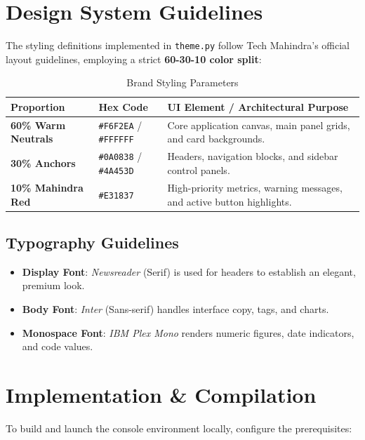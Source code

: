 \documentclass[11pt,a4paper]{article}
\begin{document}
\section{Design System Guidelines}
The styling definitions implemented in \texttt{theme.py} follow Tech Mahindra's official layout guidelines, employing a strict \textbf{60-30-10 color split}:

\begin{table}[h]
\centering
\caption{Brand Styling Parameters}
\label{tab:colors}
\begin{tabular}{@{}llp{8cm}@{}}
\toprule
\textbf{Proportion} & \textbf{Hex Code} & \textbf{UI Element / Architectural Purpose} \\ \bottomrule
\textbf{60\% Warm Neutrals}  & \texttt{\#F6F2EA} / \texttt{\#FFFFFF} & Core application canvas, main panel grids, and card backgrounds. \\
\textbf{30\% Anchors}         & \texttt{\#0A0838} / \texttt{\#4A453D} & Headers, navigation blocks, and sidebar control panels. \\
\textbf{10\% Mahindra Red}    & \texttt{\#E31837}                     & High-priority metrics, warning messages, and active button highlights. \\
\bottomrule
\end{tabular}
\end{table}

\subsection{Typography Guidelines}
\begin{itemize}
    \item \textbf{Display Font}: \textit{Newsreader} (Serif) is used for headers to establish an elegant, premium look.
    \item \textbf{Body Font}: \textit{Inter} (Sans-serif) handles interface copy, tags, and charts.
    \item \textbf{Monospace Font}: \textit{IBM Plex Mono} renders numeric figures, date indicators, and code values.
\end{itemize}

\section{Implementation \& Compilation}

To build and launch the console environment locally, configure the prerequisites:
\end{document}
